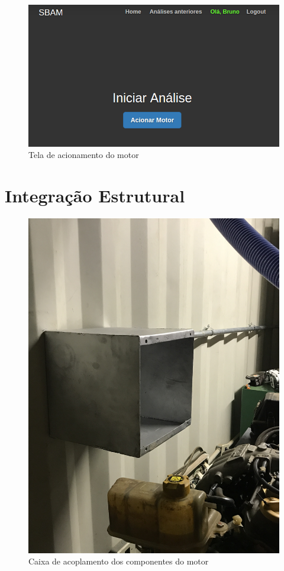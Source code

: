 \begin{figure}[h!]
	\centering
	\includegraphics[keepaspectratio=true,scale= 0.7]{figuras/acionarMotor.png}
	\caption{Tela de acionamento do motor}
	\label{acionamentoDoMotor}
\end{figure}
 

\section{Integração Estrutural}

\begin{figure}[h!]
	\centering
	\includegraphics[angle=270,keepaspectratio=true,scale= 0.09]{figuras/caixaDeAcoplamentoDosComponentesEletronicos.JPG}
	\caption{Caixa de acoplamento dos componentes do motor}
	\label{caixaDeAcoplamento}
\end{figure}


